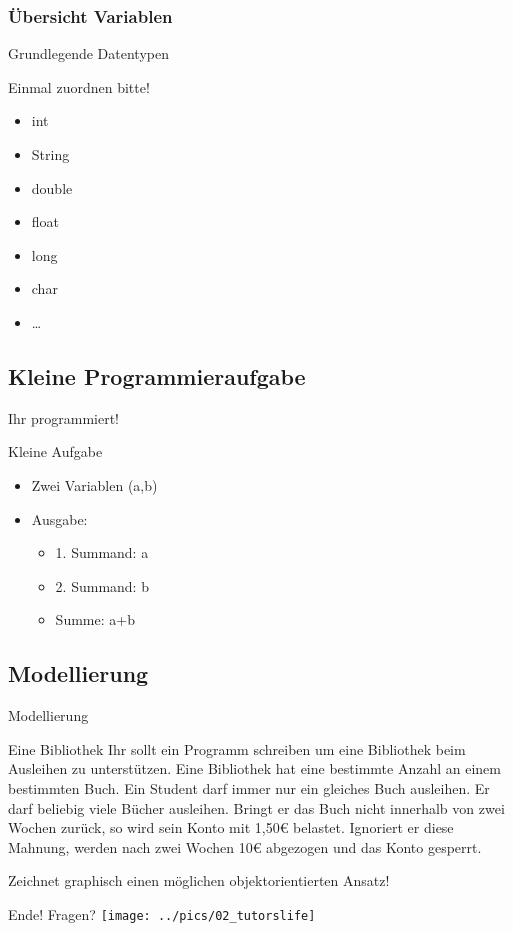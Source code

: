 \documentclass{beamer}
\begin{document}
\subsubsection{Übersicht Variablen}
\begin{frame}{Grundlegende Datentypen}
\begin{exampleblock}{Einmal zuordnen bitte!}
\begin{itemize}
\item int
\item String
\item double
\item float
\item long
\item char
\item \dots
\end{itemize}
\end{exampleblock}
\end{frame}

\subsection{Kleine Programmieraufgabe}
\begin{frame}{Ihr programmiert!}
\begin{exampleblock}{Kleine Aufgabe}
\begin{itemize}
\item Zwei Variablen (a,b)
\item Ausgabe:
\begin{itemize}
\item 1. Summand: a
\item 2. Summand: b
\item Summe: a+b
\end{itemize}
\end{itemize}
\end{exampleblock}
\end{frame}

\subsection{Modellierung}
\begin{frame}{Modellierung}
 \begin{exampleblock}{Eine Bibliothek}
 Ihr sollt ein Programm schreiben um eine Bibliothek beim Ausleihen zu unterstützen.
 Eine Bibliothek hat eine bestimmte Anzahl an einem bestimmten Buch. 
 Ein Student darf immer nur ein gleiches Buch ausleihen.
 Er darf beliebig viele Bücher ausleihen.
 Bringt er das Buch nicht innerhalb von zwei Wochen zurück, so wird sein Konto mit 1,50€ belastet.
 Ignoriert er diese Mahnung, werden nach zwei Wochen 10€ abgezogen und das Konto gesperrt.
 \end{exampleblock}
Zeichnet graphisch einen möglichen objektorientierten Ansatz!
 \end{frame}

\begin{frame}{Ende! Fragen?}
 \texttt{[image: ../pics/02\_tutorslife]} 
\end{frame}
\end{document}
